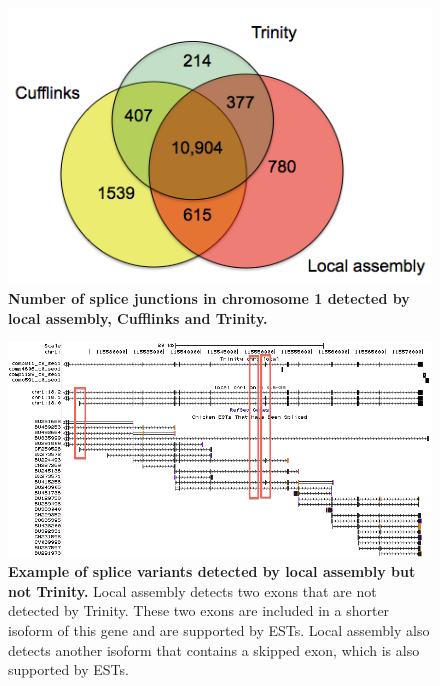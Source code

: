\documentclass[10pt]{article}
\begin{document}
\begin{figure}[!ht]
\begin{center}
\includegraphics[width=5in]{figure19.png}
\end{center}
\caption{
{\bf Number of splice junctions in chromosome 1 detected by local assembly, Cufflinks and Trinity.}
}
\label{figure19}
\end{figure}

\begin{figure}[!ht]
\begin{center}
\includegraphics[width=7in]{figure20.png}
\end{center}
\caption{
{\bf Example of splice variants detected by local assembly but not Trinity.}
Local assembly detects two exons that are not detected by Trinity.
These two exons are included in a shorter isoform of this gene and are supported by ESTs.
Local assembly also detects another isoform that contains a skipped exon, which is also supported by ESTs.
}
\label{figure20}
\end{figure}
\end{document}

